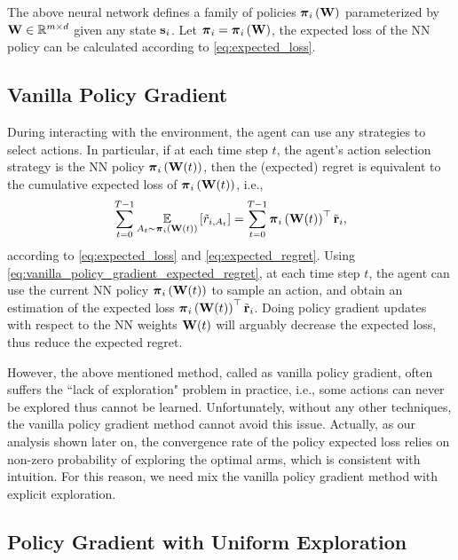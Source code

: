The above neural network defines a family of policies ${\boldsymbol{\pi}}_i \left( {\mathbf{W}} \right)$ parameterized by ${\mathbf{W}} \in {\mathbb{R}}^{m \times d}$ given any state ${\mathbf{s}}_i$. Let ${\boldsymbol{\pi}}_i = {\boldsymbol{\pi}}_i \left( {\mathbf{W}} \right)$, the expected loss of the NN policy can be calculated according to \cref{eq:expected_loss}.

\subsection{Vanilla Policy Gradient}
\label{subsec:vanilla_policy_gradient}

During interacting with the environment, the agent can use any strategies to select actions. In particular, if at each time step $t$, the agent's action selection strategy is the NN policy ${\boldsymbol{\pi}}_i\left({\mathbf{W}}(t)\right)$, then the (expected) regret is equivalent to the cumulative expected loss of ${\boldsymbol{\pi}}_i\left({\mathbf{W}}(t)\right)$, i.e., 
\begin{equation}
\label{eq:vanilla_policy_gradient_expected_regret}
\begin{split}
    \sum\limits_{t=0}^{T-1}{ \operatorname*{{\mathbb{E}}}\limits_{A_t \sim {\boldsymbol{\pi}}_i\left({\mathbf{W}}(t)\right)} \left[ \tilde{r}_{i, A_t} \right] } = \sum\limits_{t=0}^{T-1}{{\boldsymbol{\pi}}_i\left({\mathbf{W}}(t)\right)^\top {\tilde{\mathbf{r}}}_i},
\end{split}
\end{equation}
according to \cref{eq:expected_loss} and \cref{eq:expected_regret}. Using \cref{eq:vanilla_policy_gradient_expected_regret}, at each time step $t$, the agent can use the current NN policy ${\boldsymbol{\pi}}_i\left({\mathbf{W}}(t)\right)$ to sample an action, and obtain an estimation of the expected loss ${\boldsymbol{\pi}}_i\left({\mathbf{W}}(t)\right)^\top {\tilde{\mathbf{r}}}_i$. Doing policy gradient updates with respect to the NN weights ${\mathbf{W}}(t)$ will arguably decrease the expected loss, thus reduce the expected regret. 

However, the above mentioned method, called as vanilla policy gradient, often suffers the ``lack of exploration" problem in practice, i.e., some actions can never be explored thus cannot be learned. Unfortunately, without any other techniques, the vanilla policy gradient method cannot avoid this issue. Actually, as our analysis shown later on, the convergence rate of the policy expected loss relies on non-zero probability of exploring the optimal arms, which is consistent with intuition. For this reason, we need mix the vanilla policy gradient method with explicit exploration.

\subsection{Policy Gradient with Uniform Exploration}
\label{subsec:policy_gradient_with_uniform_exploration}

